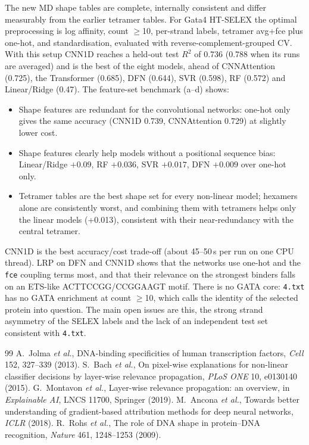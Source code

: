 \documentclass[11pt,a4paper]{article}
\begin{document}
The new MD shape tables are complete, internally consistent and differ measurably from the earlier tetramer tables. For Gata4 HT-SELEX the optimal preprocessing is log affinity, count $\geq$10, per-strand labels, tetramer avg+fce plus one-hot, and standardisation, evaluated with reverse-complement-grouped CV. With this setup CNN1D reaches a held-out test $R^2$ of 0.736 (0.788 when its runs are averaged) and is the best of the eight models, ahead of CNNAttention (0.725), the Transformer (0.685), DFN (0.644), SVR (0.598), RF (0.572) and Linear/Ridge (0.47). The feature-set benchmark (a--d) shows:
\begin{itemize}
\item Shape features are redundant for the convolutional networks: one-hot only gives the same accuracy (CNN1D 0.739, CNNAttention 0.729) at slightly lower cost.
\item Shape features clearly help models without a positional sequence bias: Linear/Ridge $+0.09$, RF $+0.036$, SVR $+0.017$, DFN $+0.009$ over one-hot only.
\item Tetramer tables are the best shape set for every non-linear model; hexamers alone are consistently worst, and combining them with tetramers helps only the linear models (+0.013), consistent with their near-redundancy with the central tetramer.
\end{itemize}
CNN1D is the best accuracy/cost trade-off (about 45--50\,s per run on one CPU thread). LRP on DFN and CNN1D shows that the networks use one-hot and the \texttt{fce} coupling terms most, and that their relevance on the strongest binders falls on an ETS-like ACTTCCGG/CCGGAAGT motif. There is no GATA core: \texttt{4.txt} has no GATA enrichment at count $\geq$10, which calls the identity of the selected protein into question. The main open issues are this, the strong strand asymmetry of the SELEX labels and the lack of an independent test set consistent with \texttt{4.txt}.


\clearpage
\begin{thebibliography}{99}
 A.~Jolma \emph{et al.}, DNA-binding specificities of human transcription factors, \emph{Cell} 152, 327--339 (2013).
 S.~Bach \emph{et al.}, On pixel-wise explanations for non-linear classifier decisions by layer-wise relevance propagation, \emph{PLoS ONE} 10, e0130140 (2015).
 G.~Montavon \emph{et al.}, Layer-wise relevance propagation: an overview, in \emph{Explainable AI}, LNCS 11700, Springer (2019).
 M.~Ancona \emph{et al.}, Towards better understanding of gradient-based attribution methods for deep neural networks, \emph{ICLR} (2018).
 R.~Rohs \emph{et al.}, The role of DNA shape in protein--DNA recognition, \emph{Nature} 461, 1248--1253 (2009).
\end{thebibliography}
\end{document}
